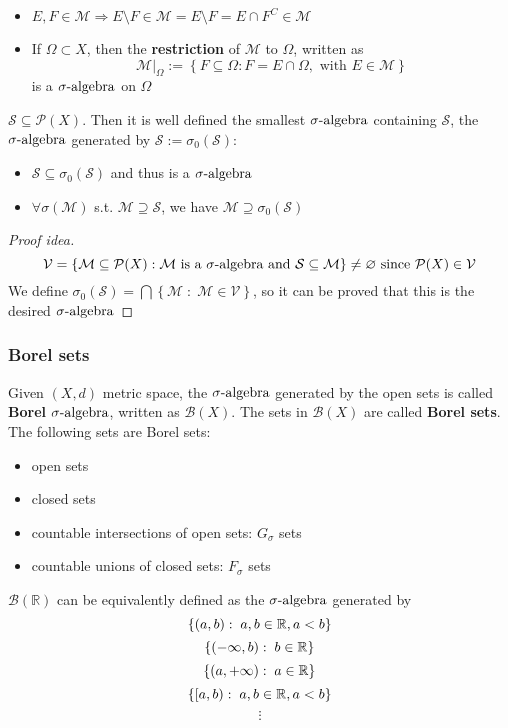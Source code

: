 \begin{itemize}
    \item \(E, F \in \mathcal{M} \Rightarrow E \setminus F \in \mathcal{M} = E \setminus F = E \cap F^C \in \mathcal{M}\)
    \item If \(\Omega \subset X\), then the \textbf{restriction} of \(\mathcal{M}\) to \(\Omega\), written as \[\mathcal{M}\vert_{\Omega} := \left\lbrace F \subseteq \Omega: F = E \cap \Omega, \mbox{ with } E \in \mathcal{M} \right\rbrace\] is a \(\sigma\mbox{-algebra}\) on \(\Omega\)
\end{itemize}
\begin{theorem}
    \(\mathcal{S} \subseteq \mathcal{P}(X)\). Then it is well defined the smallest \(\sigma\mbox{-algebra}\) containing \(\mathcal{S}\), the \(\sigma\mbox{-algebra}\) generated by \(\mathcal{S} := \sigma_0(\mathcal{S})\):
    \begin{itemize}
        \item \(\mathcal{S} \subseteq \sigma_0(\mathcal{S})\) and thus is a \(\sigma\mbox{-algebra}\)
        \item \(\forall \sigma(\mathcal{M})\) s.t. \(\mathcal{M} \supseteq \mathcal{S}\), we have \(\mathcal{M} \supseteq \sigma_0(\mathcal{S})\)
    \end{itemize}
\end{theorem}
\begin{proof}[Proof idea]
    \[
        \mathcal{V} = \left\lbrace \mathcal{M} \subseteq \mathcal{P}(X): \mathcal{M} \mbox{ is a } \sigma\mbox{-algebra} \mbox{ and }\mathcal{S} \subseteq \mathcal{M}\right\rbrace \not = \varnothing \mbox{ since } \mathcal{P}(X) \in \mathcal{V}
    \]
    We define \(\sigma_0(\mathcal{S}) = \bigcap \left\lbrace \mathcal{M} \; : \; \mathcal{M} \in \mathcal{V}\right\rbrace\), so it can be proved that this is the desired \(\sigma\mbox{-algebra}\)
\end{proof}
\subsubsection*{Borel sets}
Given \((X, d)\) metric space, the \(\sigma\mbox{-algebra}\) generated by the open sets is called \textbf{Borel} \(\sigma\mbox{-algebra}\), written as \(\mathcal{B}(X)\). The sets in \(\mathcal{B}(X)\) are called \textbf{Borel sets}. The following sets are Borel sets:
\begin{itemize}
    \item open sets
    \item closed sets
    \item countable intersections of open sets: \(G_{\sigma}\) sets
    \item countable unions of closed sets: \(F_{\sigma}\) sets
\end{itemize}

\begin{remark}
    \(\mathcal{B}(\mathbb{R})\) can be equivalently defined as the \(\sigma\mbox{-algebra}\) generated by 
    \[
        \left\lbrace (a,b): \; a,b \in \mathbb{R}, a < b \right\rbrace
    \]
    \[
        \left\lbrace (-\infty,b): \; b \in \mathbb{R} \right\rbrace
    \]
    \[
        \left\lbrace (a,+\infty ): \; a \in \mathbb{R} \right\rbrace
    \]
    \[
        \left\lbrace [a,b): \; a,b \in \mathbb{R}, a < b \right\rbrace
    \]
    \[
        \vdots
    \]
\end{remark}

